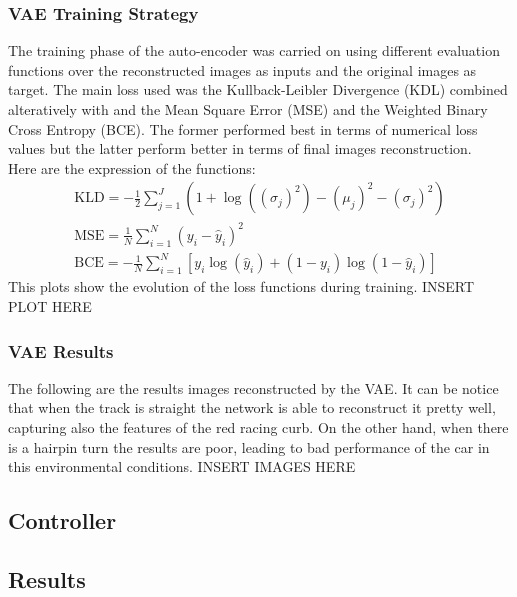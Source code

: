 \documentclass[10pt,a4paper]{article}
\begin{document}
\subsubsection{VAE Training Strategy}
The training phase of the auto-encoder was carried on using different evaluation functions over the reconstructed images as inputs and the original images as target. The main loss used was the Kullback-Leibler Divergence (KDL) combined alteratively  with and the Mean Square Error (MSE) and the Weighted Binary Cross Entropy (BCE). The former performed best in terms of numerical loss values but the latter perform better in terms of final images reconstruction.\\
Here are the expression of the functions:
\begin{gather}
    \text{KLD} = -\frac{1}{2} \sum_{j=1}^J (1 + \log((\sigma_j)^2) - (\mu_j)^2 - (\sigma_j)^2) \\
    \text{MSE} = \frac{1}{N} \sum_{i=1}^N (y_i - \hat{y}_i)^2 \\
    \text{BCE} = -\frac{1}{N} \sum_{i=1}^N [y_i \log(\hat{y}_i) + (1 - y_i) \log(1 - \hat{y}_i)]
\end{gather}
This plots show  the evolution of the loss functions during training.
INSERT PLOT HERE

\subsubsection{VAE Results}
The following are the results images reconstructed by the VAE. It can be notice that when the track is straight the network is able to reconstruct it pretty well, capturing also the features of the red racing curb. On the other hand, when there is a hairpin turn the results are poor, leading to bad performance of the car in this environmental conditions.
INSERT IMAGES HERE

\newpage


\subsection*{Controller}
\newpage

\subsection{Results}
\newpage

\newpage


\printbibliography

\end{document}
